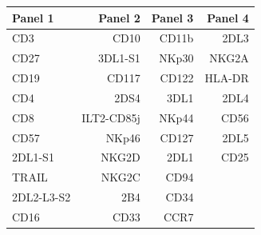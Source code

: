 \begin{tabular}{lrrr}
\toprule
Panel 1 & Panel 2 & Panel 3 & Panel 4 \\
\midrule
CD3 & CD10 & CD11b & 2DL3 \\
CD27 & 3DL1-S1 & NKp30 & NKG2A \\
CD19 & CD117 & CD122 & HLA-DR \\
CD4 & 2DS4 & 3DL1 & 2DL4 \\
CD8 & ILT2-CD85j & NKp44 & CD56 \\
CD57 & NKp46 & CD127 & 2DL5 \\
2DL1-S1 & NKG2D & 2DL1 & CD25 \\
TRAIL & NKG2C & CD94 &  \\
2DL2-L3-S2 & 2B4 & CD34 &  \\
CD16 & CD33 & CCR7 &  \\
\bottomrule
\end{tabular}
